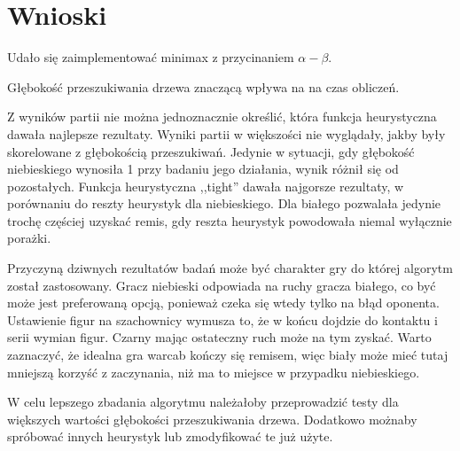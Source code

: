 \section{Wnioski}

Udało się zaimplementować minimax z przycinaniem $\alpha-\beta$.

Głębokość przeszukiwania drzewa znaczącą wpływa na na czas obliczeń.

Z wyników partii nie można jednoznacznie określić, która funkcja heurystyczna
dawała najlepsze rezultaty. Wyniki partii  w większości nie wyglądały, jakby
były skorelowane z głębokością przeszukiwań. Jedynie w sytuacji, gdy głębokość
niebieskiego wynosiła 1 przy badaniu jego działania, wynik różnił się od
pozostałych. Funkcja heurystyczna ,,tight'' dawała najgorsze rezultaty, w
porównaniu do reszty heurystyk dla niebieskiego. Dla białego pozwalała jedynie
trochę częściej uzyskać remis, gdy reszta heurystyk powodowała niemal wyłącznie
porażki.

Przyczyną dziwnych rezultatów badań może być charakter gry do której algorytm
został zastosowany. Gracz niebieski odpowiada na ruchy gracza białego, co być
może jest preferowaną opcją, ponieważ czeka się wtedy tylko na błąd oponenta.
Ustawienie figur na szachownicy wymusza to, że w końcu dojdzie do kontaktu i
serii wymian figur. Czarny mając ostateczny ruch może na tym zyskać. Warto
zaznaczyć, że idealna gra warcab kończy się remisem, więc biały może mieć tutaj
mniejszą korzyść z zaczynania, niż ma to miejsce w przypadku niebieskiego.

W celu lepszego zbadania algorytmu należałoby przeprowadzić testy dla większych
wartości głębokości przeszukiwania drzewa. Dodatkowo możnaby spróbować innych
heurystyk lub zmodyfikować te już użyte.

